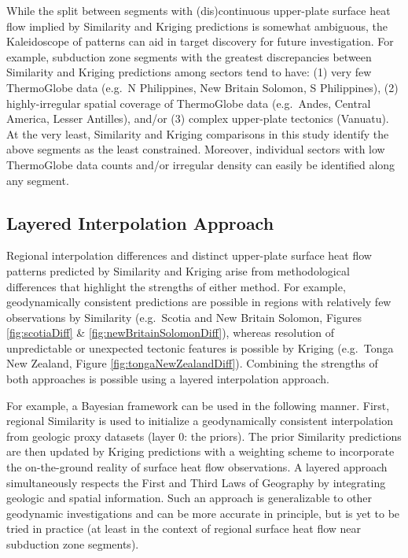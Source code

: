 While the split between segments with (dis)continuous upper-plate surface heat flow implied by Similarity and Kriging predictions is somewhat ambiguous, the Kaleidoscope of patterns can aid in target discovery for future investigation. For example, subduction zone segments with the greatest discrepancies between Similarity and Kriging predictions among sectors tend to have: (1) very few ThermoGlobe data (e.g.~N Philippines, New Britain Solomon, S Philippines), (2) highly-irregular spatial coverage of ThermoGlobe data (e.g.~Andes, Central America, Lesser Antilles), and/or (3) complex upper-plate tectonics (Vanuatu). At the very least, Similarity and Kriging comparisons in this study identify the above segments as the least constrained. Moreover, individual sectors with low ThermoGlobe data counts and/or irregular density can easily be identified along any segment.

\hypertarget{layered-interpolation-approach}{%
\subsection{Layered Interpolation Approach}\label{layered-interpolation-approach}}

Regional interpolation differences and distinct upper-plate surface heat flow patterns predicted by Similarity and Kriging arise from methodological differences that highlight the strengths of either method. For example, geodynamically consistent predictions are possible in regions with relatively few observations by Similarity (e.g.~Scotia and New Britain Solomon, Figures \ref{fig:scotiaDiff} \& \ref{fig:newBritainSolomonDiff}), whereas resolution of unpredictable or unexpected tectonic features is possible by Kriging (e.g.~Tonga New Zealand, Figure \ref{fig:tongaNewZealandDiff}). Combining the strengths of both approaches is possible using a layered interpolation approach.

For example, a Bayesian framework can be used in the following manner. First, regional Similarity is used to initialize a geodynamically consistent interpolation from geologic proxy datasets (layer 0: the priors). The prior Similarity predictions are then updated by Kriging predictions with a weighting scheme to incorporate the on-the-ground reality of surface heat flow observations. A layered approach simultaneously respects the First and Third Laws of Geography by integrating geologic and spatial information. Such an approach is generalizable to other geodynamic investigations and can be more accurate in principle, but is yet to be tried in practice (at least in the context of regional surface heat flow near subduction zone segments).

